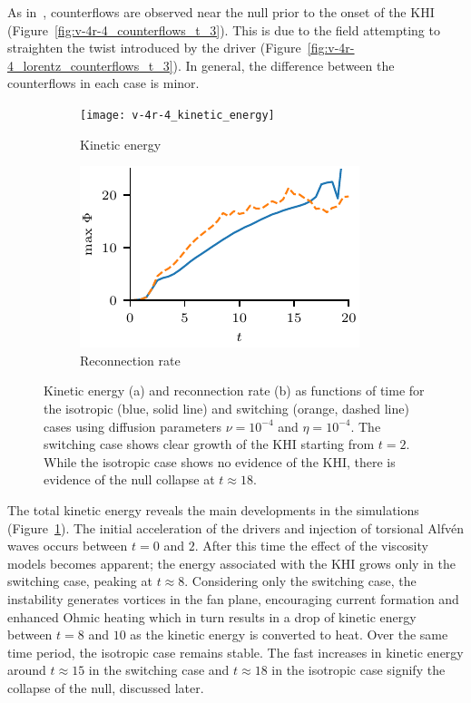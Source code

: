 As in~\cite{wyperKelvinHelmholtzInstabilityCurrentvortex2013}, counterflows are observed near the null prior to the onset of the KHI (Figure~\ref{fig:v-4r-4_counterflows_t_3}). This is due to the field attempting to straighten the twist introduced by the driver (Figure~\ref{fig:v-4r-4_lorentz_counterflows_t_3}). In general, the difference between the counterflows in each case is minor. 

\begin{figure}[t]
  \centering
  \begin{subfigure}{0.49\textwidth}
    \texttt{[image: v-4r-4\_kinetic\_energy]}
    \caption{Kinetic energy}
    \label{fig:v-4r-4_kinetic_energy}
  \end{subfigure}
  \hfill
  \begin{subfigure}{0.49\textwidth}
    \includegraphics[width=\linewidth]{v-4r-4_reconn_rate_over_time}
    \caption{Reconnection rate}%
    \label{fig:v-4r-4_reconn_rate_over_time}
  \end{subfigure}
  \caption{Kinetic energy (a) and reconnection rate (b) as functions of time for the isotropic (blue, solid line) and switching (orange, dashed line) cases using diffusion parameters $\nu=10^{-4}$ and $\eta=10^{-4}$. The switching case shows clear growth of the KHI starting from $t=2$. While the isotropic case shows no evidence of the KHI, there is evidence of the null collapse at $t\approx18$. }
\end{figure}


The total kinetic energy reveals the main developments in the simulations (Figure~\ref{fig:v-4r-4_kinetic_energy}). The initial acceleration of the drivers and injection of torsional Alfv\'en waves occurs between $t=0$ and $2$. After this time the effect of the viscosity models becomes apparent; the energy associated with the KHI grows only in the switching case, peaking at $t\approx 8$. Considering only the switching case, the instability generates vortices in the fan plane, encouraging current formation and enhanced Ohmic heating which in turn results in a drop of kinetic energy between $t=8$ and $10$ as the kinetic energy is converted to heat. Over the same time period, the isotropic case remains stable. The fast increases in kinetic energy around $t\approx 15$ in the switching case and $t\approx 18$ in the isotropic case signify the collapse of the null, discussed later.

